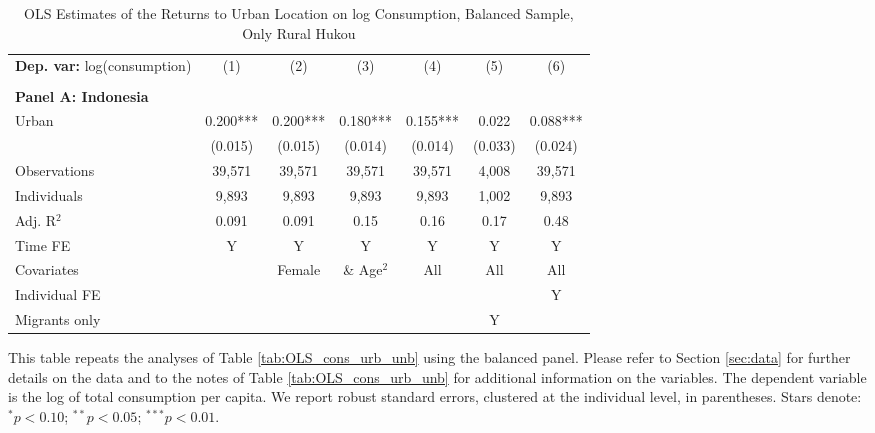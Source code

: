 \begin{table}[htbp] \centering \begin{threeparttable}
 \caption{OLS Estimates of the Returns to Urban Location on log Consumption, Balanced Sample, Only Rural Hukou} 
 \label{tab:OLS_CHN_hukou_rural_only_consumption_urban_bal} 
\begin{tabular}{l cccccc} \toprule  \textbf{Dep. var:}  log(consumption) 
                    &\multicolumn{1}{c}{(1)}   &\multicolumn{1}{c}{(2)}   &\multicolumn{1}{c}{(3)}   &\multicolumn{1}{c}{(4)}   &\multicolumn{1}{c}{(5)}   &\multicolumn{1}{c}{(6)}   \\
                    &               &               &               &               &               &               \\
\textbf{Panel A: Indonesia} \\
Urban               &       0.200***&       0.200***&       0.180***&       0.155***&       0.022   &       0.088***\\
                    &     (0.015)   &     (0.015)   &     (0.014)   &     (0.014)   &     (0.033)   &     (0.024)   \\
\addlinespace
Observations        &      39,571   &      39,571   &      39,571   &      39,571   &       4,008   &      39,571   \\
Individuals         &       9,893   &       9,893   &       9,893   &       9,893   &       1,002   &       9,893   \\
Adj. R$^{2}$        &       0.091   &       0.091   &        0.15   &        0.16   &        0.17   &        0.48   \\
\cmidrule{2 -7} Time FE & Y & Y & Y & Y & Y & Y \\ Covariates & & Female & \& Age$^2$ & All & All & All \\ Individual FE & & & & & & Y \\ Migrants only & & & & & Y & \\ \bottomrule \end{tabular} \begin{tablenotes}[flushleft] \footnotesize \item{This table repeats the analyses of Table \ref{tab:OLS_cons_urb_unb}  using the balanced panel. Please refer to Section \ref{sec:data} for further details on the data and to the notes of Table \ref{tab:OLS_cons_urb_unb} for additional information on the variables. The dependent variable is the log of total consumption per capita. We report robust standard errors, clustered at the individual level, in parentheses. Stars denote: $^{*} p<0.10$; $^{**} p<0.05$; $^{***} p<0.01$.} \end{tablenotes} \end{threeparttable} \end{table}
